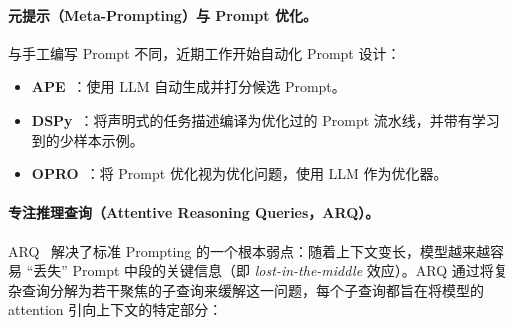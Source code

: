 \paragraph{元提示（Meta-Prompting）与 Prompt 优化。}
\label{meta-prompting-and-prompt-optimization.}

与手工编写 Prompt 不同，近期工作开始自动化 Prompt 设计：

\begin{itemize}
  \item \textbf{APE}~\cite{zhou2023large}：使用 LLM 自动生成并打分候选 Prompt。
  \item \textbf{DSPy}~\cite{khattab2023dspy}：将声明式的任务描述编译为优化过的 Prompt 流水线，并带有学习到的少样本示例。
  \item \textbf{OPRO}~\cite{yang2024large}：将 Prompt 优化视为优化问题，使用 LLM 作为优化器。
\end{itemize}

\paragraph{专注推理查询（Attentive Reasoning Queries，ARQ）。}
\label{attentive-reasoning-queries-arq.}

ARQ~\cite{yang2025arq} 解决了标准 Prompting 的一个根本弱点：随着上下文变长，模型越来越容易 ``丢失'' Prompt 中段的关键信息（即 \emph{lost-in-the-middle} 效应）。ARQ 通过将复杂查询分解为若干聚焦的子查询来缓解这一问题，每个子查询都旨在将模型的 attention 引向上下文的特定部分：

